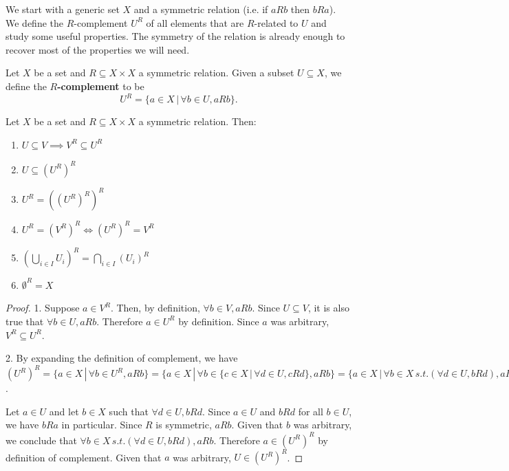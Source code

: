 We start with a generic set $X$ and a symmetric relation (i.e. if $aRb$ then $bRa$). We define the $R$-complement $U^R$ of all elements that are $R$-related to $U$ and study some useful properties. The symmetry of the relation is already enough to recover most of the properties we will need.

\begin{mathSection}
	\begin{defn}
		Let $X$ be a set and $R \subseteq X \times X$ a symmetric relation. Given a subset $U \subseteq X$, we define the \textbf{$R$-complement} to be
		$$ U^{R} = \{ a \in X \, | \, \forall b \in U, aRb  \}. $$
	\end{defn}
	
	\begin{prop}\label{pm_es_rComplProps}
		Let $X$ be a set and $R \subseteq X \times X$ a symmetric relation. Then:
		\begin{enumerate}
			\item $U \subseteq V \implies V^{R} \subseteq U^{R}$
			\item $U \subseteq (U^{R})^{R}$
			\item $U^{R} = ((U^{R})^{R})^{R}$
			\item $U^{R} = (V^{R})^{R} \iff (U^{R})^{R} = V^{R}$
			\item $(\bigcup_{i \in I} U_i )^{R} = \bigcap_{i \in I} (U_i)^{R}$
			\item $\emptyset^{R} = X$
		\end{enumerate}
	\end{prop}
	
	\begin{proof}
		1. Suppose $a \in V^{R}$. Then, by definition, $\forall b \in V, aRb$. Since $U \subseteq V$, it is also true that $\forall b \in U, aRb$. Therefore $a \in U^{R}$ by definition. Since $a$ was arbitrary, $V^{R} \subseteq U^{R}$.
		
		2. By expanding the definition of complement, we have $(U^{R})^{R}=\{ a \in X \, | \, \forall b \in U^{R}, aRb \} = \{ a \in X \, | \, \forall b \in \{ c \in X \, | \, \forall d \in U, cRd  \}, aRb \} = \{ a \in X \, | \, \forall b \in X \, s.t. (\forall d \in U, bRd), aRb \}$.
		
		Let $a \in U$ and let $b \in X$ such that $\forall d \in U, bRd$. Since $a \in U$ and $bRd$ for all $b \in U$, we have $bRa$ in particular. Since $R$ is symmetric, $aRb$. Given that $b$ was arbitrary, we conclude that $\forall b \in X \, s.t. (\forall d \in U, bRd), aRb$. Therefore $a \in (U^{R})^{R}$ by definition of complement. Given that $a$ was arbitrary, $U \in (U^{R})^{R}$.
		

\end{proof}
\end{mathSection}
